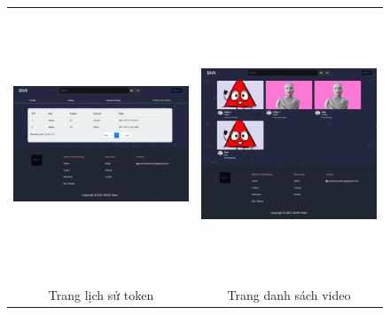 \begin{center}
\begin{figure}[H]
\begin{tabular}{cc}
  \includegraphics[width=8.5cm,height=8cm]{./imgs/layouts/history_tokens} &   \includegraphics[width=8.5cm,height=8cm]{./imgs/layouts/videos} \\
Trang lịch sử token & Trang danh sách video \\[6pt]
\end{tabular}
\end{figure}
\end{center}

